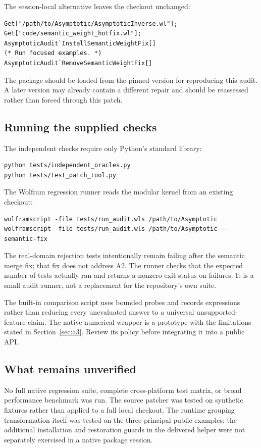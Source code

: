 \documentclass[11pt,letterpaper]{article}
\begin{document}
The session-local alternative leaves the checkout unchanged:
\begin{lstlisting}
Get["/path/to/Asymptotic/AsymptoticInverse.wl"];
Get["code/semantic_weight_hotfix.wl"];
AsymptoticAudit`InstallSemanticWeightFix[]
(* Run focused examples. *)
AsymptoticAudit`RemoveSemanticWeightFix[]
\end{lstlisting}
The package should be loaded from the pinned version for reproducing this audit. A later version may already contain a different repair and should be reassessed rather than forced through this patch.

\subsection{Running the supplied checks}
The independent checks require only Python's standard library:
\begin{lstlisting}
python tests/independent_oracles.py
python tests/test_patch_tool.py
\end{lstlisting}
The Wolfram regression runner reads the modular kernel from an existing checkout:
\begin{lstlisting}
wolframscript -file tests/run_audit.wls /path/to/Asymptotic
wolframscript -file tests/run_audit.wls /path/to/Asymptotic --semantic-fix
\end{lstlisting}
The real-domain rejection tests intentionally remain failing after the semantic merge fix; that fix does not address A2. The runner checks that the expected number of tests actually ran and returns a nonzero exit status on failures. It is a small audit runner, not a replacement for the repository's own suite.

The built-in comparison script uses bounded probes and records expressions rather than reducing every unevaluated answer to a universal unsupported-feature claim. The native numerical wrapper is a prototype with the limitations stated in Section~\ref{sec:a3}. Review its policy before integrating it into a public API.

\subsection{What remains unverified}
No full native regression suite, complete cross-platform test matrix, or broad performance benchmark was run. The source patcher was tested on synthetic fixtures rather than applied to a full local checkout. The runtime grouping transformation itself was tested on the three principal public examples; the additional installation and restoration guards in the delivered helper were not separately exercised in a native package session.
\end{document}
